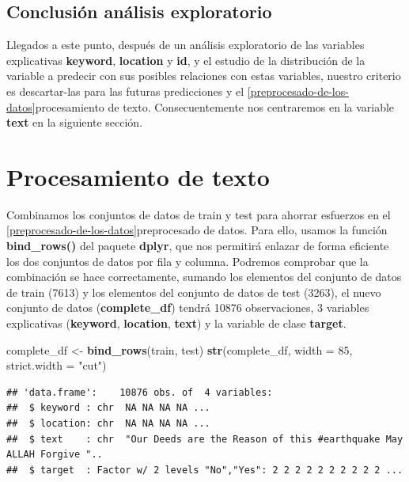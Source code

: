 \documentclass[]{article}
\newenvironment{Shaded}{\begin{snugshade}}{\end{snugshade}}
\newcommand{\DataTypeTok}[1]{\textcolor[rgb]{0.13,0.29,0.53}{#1}}
\newcommand{\DecValTok}[1]{\textcolor[rgb]{0.00,0.00,0.81}{#1}}
\newcommand{\KeywordTok}[1]{\textcolor[rgb]{0.13,0.29,0.53}{\textbf{#1}}}
\newcommand{\NormalTok}[1]{#1}
\newcommand{\StringTok}[1]{\textcolor[rgb]{0.31,0.60,0.02}{#1}}
\begin{document}
\hypertarget{conclusiuxf3n-anuxe1lisis-exploratorio}{%
\subsection{Conclusión análisis
exploratorio}\label{conclusiuxf3n-anuxe1lisis-exploratorio}}

Llegados a este punto, después de un análisis exploratorio de las variables explicativas \textbf{keyword}, \textbf{location} y \textbf{id}, y el estudio de la distribución de la variable a predecir con sus posibles relaciones con estas variables, nuestro criterio es descartar-las para las futuras predicciones y el \ref{preprocesado-de-los-datos}{procesamiento de texto}. Consecuentemente nos centraremos en la variable \textbf{text} en la siguiente sección.

\hypertarget{procesamiento-de-texto}{%
\section{Procesamiento de texto}\label{procesamiento-de-texto}}

Combinamos los conjuntos de datos de train y test para ahorrar esfuerzos
en el \ref{preprocesado-de-los-datos}{preprocesado de datos}. Para ello, usamos la función
\textbf{bind\_rows()} del paquete \textbf{dplyr}, que nos permitirá enlazar de forma eficiente los dos
conjuntos de datos por fila y columna. Podremos comprobar que la
combinación se hace correctamente, sumando los elementos del conjunto de datos de train (7613)
y los elementos del conjunto de datos de test (3263), el nuevo conjunto de datos (\textbf{complete\_df})
tendrá 10876 observaciones, 3 variables explicativas (\textbf{keyword},
\textbf{location}, \textbf{text}) y la variable de clase
\textbf{target}.

\vspace{3mm}

\begin{Shaded}
\begin{Highlighting}[]
\NormalTok{complete_df <-}\StringTok{ }\KeywordTok{bind_rows}\NormalTok{(train, test)}
\KeywordTok{str}\NormalTok{(complete_df, }\DataTypeTok{width =} \DecValTok{85}\NormalTok{, }\DataTypeTok{strict.width =} \StringTok{"cut"}\NormalTok{)}
\end{Highlighting}
\end{Shaded}

\begin{verbatim}
## 'data.frame':    10876 obs. of  4 variables:
##  $ keyword : chr  NA NA NA NA ...
##  $ location: chr  NA NA NA NA ...
##  $ text    : chr  "Our Deeds are the Reason of this #earthquake May ALLAH Forgive "..
##  $ target  : Factor w/ 2 levels "No","Yes": 2 2 2 2 2 2 2 2 2 2 ...
\end{verbatim}
\end{document}
